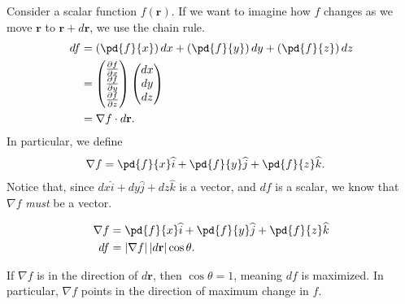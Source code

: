 \documentclass[10pt]{mypackage}
\begin{document}
Consider a scalar function $f\left(\mathbf{r}\right)$. If we want to imagine how $f$ changes as we move $\mathbf{r}$ to $\mathbf{r} + d\mathbf{r}$, we use the chain rule.
\begin{align*}
  df &= \left(\pd{f}{x}\right)dx + \left(\pd{f}{y}\right)dy + \left(\pd{f}{z}\right)dz\\
     &= \begin{pmatrix}\frac{\partial f}{\partial x}\\\frac{\partial f}{\partial y}\\\frac{\partial f}{\partial z}\end{pmatrix} \begin{pmatrix}dx\\dy\\dz\end{pmatrix}\\
     &= \nabla f \cdot d\mathbf{r}.
\end{align*}
In particular, we define
\begin{align*}
  \nabla f &= \pd{f}{x} \widehat{i} + \pd{f}{y}\widehat{j} + \pd{f}{z}\widehat{k}.
\end{align*}
Notice that, since $dx\widehat{i} + dy\widehat{j} + dz\widehat{k}$ is a vector, and $df$ is a scalar, we know that $\nabla f$ \textit{must} be a vector.
\begin{definition}[Gradient]
  \begin{align*}
    \nabla f &= \pd{f}{x} \widehat{i} + \pd{f}{y}\widehat{j} + \pd{f}{z}\widehat{k}\\
    df &= \left\vert \nabla f \right\vert \left\vert d\mathbf{r} \right\vert \cos\theta.
  \end{align*}
\end{definition}
If $\nabla f$ is in the direction of $d\mathbf{r}$, then $\cos\theta = 1$, meaning $df$ is maximized. In particular, $\nabla f$ points in the direction of maximum change in $f$.\newline
\end{document}
